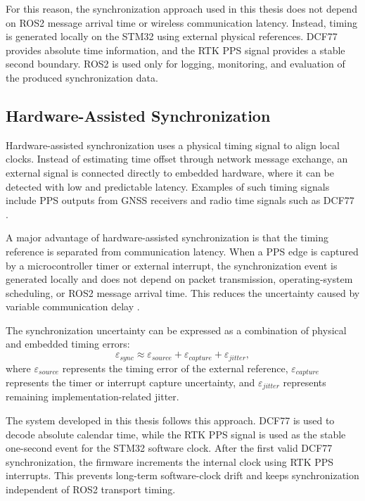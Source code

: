 For this reason, the synchronization approach used in this thesis does not depend on ROS2 message arrival time or wireless communication latency. Instead, timing is generated locally on the STM32 using external physical references. DCF77 provides absolute time information, and the RTK PPS signal provides a stable second boundary. ROS2 is used only for logging, monitoring, and evaluation of the produced synchronization data.

\subsection{Hardware-Assisted Synchronization}

Hardware-assisted synchronization uses a physical timing signal to align local clocks. Instead of estimating time offset through network message exchange, an external signal is connected directly to embedded hardware, where it can be detected with low and predictable latency. Examples of such timing signals include PPS outputs from GNSS receivers and radio time signals such as DCF77 \cite{ptbDcf77}.

A major advantage of hardware-assisted synchronization is that the timing reference is separated from communication latency. When a PPS edge is captured by a microcontroller timer or external interrupt, the synchronization event is generated locally and does not depend on packet transmission, operating-system scheduling, or ROS2 message arrival time. This reduces the uncertainty caused by variable communication delay \cite{kopetz2011realtime}.

The synchronization uncertainty can be expressed as a combination of physical and embedded timing errors:
\begin{equation}
\varepsilon_{sync} \approx \varepsilon_{source} + \varepsilon_{capture} + \varepsilon_{jitter},
\end{equation}
where $\varepsilon_{source}$ represents the timing error of the external reference, $\varepsilon_{capture}$ represents the timer or interrupt capture uncertainty, and $\varepsilon_{jitter}$ represents remaining implementation-related jitter.

The system developed in this thesis follows this approach. DCF77 is used to decode absolute calendar time, while the RTK PPS signal is used as the stable one-second event for the STM32 software clock. After the first valid DCF77 synchronization, the firmware increments the internal clock using RTK PPS interrupts. This prevents long-term software-clock drift and keeps synchronization independent of ROS2 transport timing.

